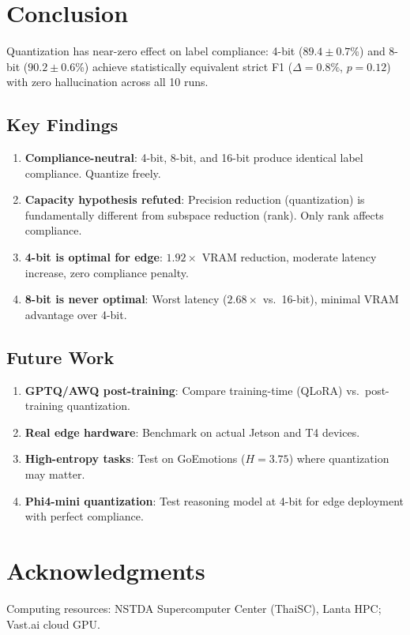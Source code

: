 \documentclass[journal]{IEEEtran}
\begin{document}
\section{Conclusion}
Quantization has near-zero effect on label compliance: 4-bit ($89.4 \pm 0.7$\%) and 8-bit ($90.2 \pm 0.6$\%) achieve statistically equivalent strict F1 ($\Delta = 0.8\%$, $p = 0.12$) with zero hallucination across all 10 runs.

\subsection{Key Findings}
\begin{enumerate}
\item \textbf{Compliance-neutral}: 4-bit, 8-bit, and 16-bit produce identical label compliance. Quantize freely.
\item \textbf{Capacity hypothesis refuted}: Precision reduction (quantization) is fundamentally different from subspace reduction (rank). Only rank affects compliance.
\item \textbf{4-bit is optimal for edge}: $1.92\times$ VRAM reduction, moderate latency increase, zero compliance penalty.
\item \textbf{8-bit is never optimal}: Worst latency ($2.68\times$ vs.\ 16-bit), minimal VRAM advantage over 4-bit.
\end{enumerate}

\subsection{Future Work}
\begin{enumerate}
\item \textbf{GPTQ/AWQ post-training}: Compare training-time (QLoRA) vs.\ post-training quantization.
\item \textbf{Real edge hardware}: Benchmark on actual Jetson and T4 devices.
\item \textbf{High-entropy tasks}: Test on GoEmotions ($H = 3.75$) where quantization may matter.
\item \textbf{Phi4-mini quantization}: Test reasoning model at 4-bit for edge deployment with perfect compliance.
\end{enumerate}

\section*{Acknowledgments}
Computing resources: NSTDA Supercomputer Center (ThaiSC), Lanta HPC; Vast.ai cloud GPU.
\end{document}
